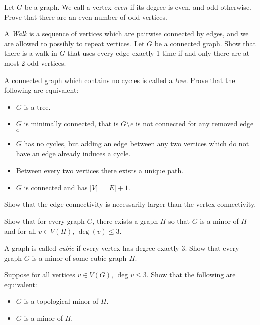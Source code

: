 \clearpage
{}
\begin{exercise}
 Let $G$ be a graph. We call a vertex \emph{even} if its degree is even, and odd otherwise.  Prove that there are an even number of odd vertices. 
 \label{exer:evengraph} 
\end{exercise}

\begin{exercise}
 A \emph{Walk} is a sequence of vertices which are pairwise connected by edges, and we are allowed to possibly to repeat vertices. Let $G$ be a connected graph. Show that there is a walk in $G$ that uses every edge exactly 1 time if and only there are at most 2 odd vertices.\label{exer:konigs} 	
\end{exercise}
\begin{exercise}
 A connected graph which contains no cycles is called a \emph{tree.} Prove that the following are equivalent:
	\begin{itemize}
		\item $G$ is a tree. 
		\item $G$ is minimally connected,  that is $G\setminus e$ is not connected for any removed edge $e$
		\item $G$ has no cycles, but adding an edge between any two vertices which do not have an edge already induces a cycle.  
		\item Between every two vertices there exists a unique path. 
		\item $G$ is connected and has $|V|=|E|+1$. \\
	\end{itemize}
	\label{exer:tree}
\end{exercise}
\begin{exercise}
Show that the edge connectivity is necessarily larger than the vertex connectivity. 
\label{exer:edgeconnectivity}
\end{exercise}
\begin{exercise}
Show that for every graph $G$, there exists a graph $H$ so that $G$ is a minor of $H$ and for all $v\in V(H)$, $\deg(v)\leq 3$. \label{exer:cubiceasy}
\end{exercise}

\begin{exercise}
A graph is called \emph{cubic} if every vertex has degree exactly 3. Show that every graph $G$ is a minor of some cubic graph $H$. \label{exer:cubichard}
\end{exercise}

\begin{exercise}
\label{exer:3minors}
Suppose for all vertices $v\in V(G)$, $\deg v\leq 3$. Show that the following are equivalent:
\begin{itemize}
\item $G$ is a topological minor of $H$. 
\item $G$ is a minor of $H$. 
\end{itemize}
\end{exercise}

